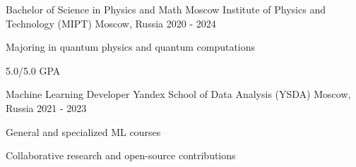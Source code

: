 
\begin{cventries}
  \cventry
    {Bachelor of Science in Physics and Math} %
    {Moscow Institute of Physics and Technology (MIPT)} %
    {Moscow, Russia} %
    {2020 - 2024} %
    {
        \begin{cvitems}
         \item {Majoring in quantum physics and quantum computations}
         \item {5.0/5.0 GPA}
        \end{cvitems}
    }
    
  \cventry
    {Machine Learning Developer}
    {Yandex School of Data Analysis (YSDA)}
    {Moscow, Russia}
    {2021 - 2023}
    {
       \begin{cvitems} %
        \item { General and specialized ML courses  }
        \item { Collaborative research and open-source contributions }
      \end{cvitems}
    }
\end{cventries}
